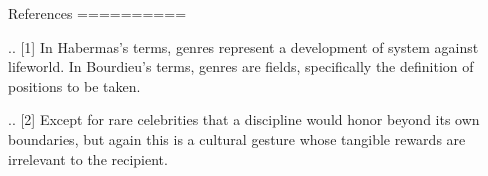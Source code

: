 References
==========

.. [1]
   In Habermas's terms, genres represent a development of system against
   lifeworld. In Bourdieu's terms, genres are fields, specifically the
   definition of positions to be taken.

.. [2]
   Except for rare celebrities that a discipline would honor beyond its
   own boundaries, but again this is a cultural gesture whose tangible
   rewards are irrelevant to the recipient.
